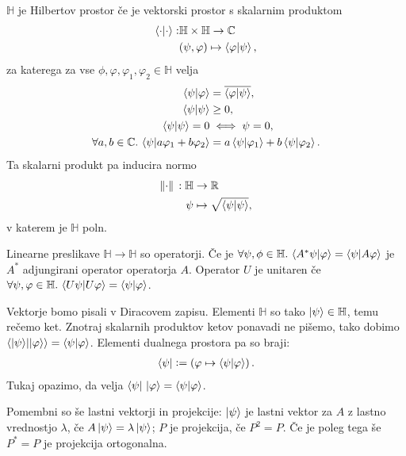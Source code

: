 \documentclass[mat1]{fmfdelo}
\newcommand{\R}{\mathbb R}
\newcommand{\C}{\mathbb C}
\newcommand{\Hb}{\mathbb H}
\newcommand{\defeq}{\vcentcolon=}
\newcommand{\sep}{\ensuremath{.\,}}
\begin{document}
\begin{definicija} \(\Hb\) je Hilbertov prostor če je vektorski prostor s skalarnim produktom
    \begin{align*}
        \braket{\cdot}{\cdot} :& \Hb \times \Hb \to \C\\
        & (\psi, \varphi) \mapsto \braket{\varphi}{\psi},
    \end{align*}
    za katerega za vse \(\phi, \varphi, \varphi_1, \varphi_2 \in \Hb\) velja
    \begin{align*}
        \braket{\psi}{\varphi} &= \overline{\braket{\varphi}{\psi}},\\
        \braket\psi &\geq 0,\\
        \braket\psi = 0 &\iff \psi = 0,\\
        \forall a,b\in\C\sep \braket{\psi}{a\varphi_1 + b\varphi_2} &=a\braket{\psi}{\varphi_1} + b\braket{\psi}{\varphi_2}.
    \end{align*}
    Ta skalarni produkt pa inducira normo
    \begin{align*}
        \norm*{\cdot} : \Hb &\to \R\\
        \psi &\mapsto \sqrt{\braket\psi},
    \end{align*}
    v katerem je \(\Hb\) poln.
\end{definicija}

Linearne preslikave \(\Hb\to\Hb\) so operatorji. Če je \(\forall \psi,\phi\in\Hb\sep\braket{A^*\psi}{\varphi} = \braket{\psi}{A\varphi}\) je \(A^*\) adjungirani operator operatorja \(A\). Operator \(U\) je unitaren če \(\forall \psi,\varphi\in\Hb\sep \braket{U\psi}{U\varphi} = \braket{\psi}{\varphi}\).

Vektorje bomo pisali v Diracovem zapisu. Elementi \(\Hb\) so tako \(\ket{\psi}\in\Hb\), temu rečemo ket. Znotraj skalarnih produktov ketov ponavadi ne pišemo, tako dobimo \(\braket{\ket\psi}{\ket\varphi} = \braket{\psi}{\varphi}\). Elementi dualnega prostora pa so braji:
\begin{align*}
    \bra{\psi} \defeq \left(\varphi \mapsto \braket{\psi}{\varphi} \right).
\end{align*}
Tukaj opazimo, da velja \(\bra{\psi}\, \ket{\varphi} = \braket{\psi}{\varphi}\).

Pomembni so še lastni vektorji in projekcije: \(\ket{\psi}\) je lastni vektor za \(A\) z lastno vrednostjo \(\lambda\), če \(A\ket\psi = \lambda \ket\psi\); \(P\) je projekcija, če \(P^2 = P\). Če je poleg tega še \(P^* = P\) je projekcija ortogonalna.
\end{document}
